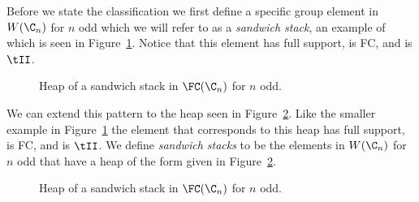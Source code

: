 Before we state the classification we first define a specific group element in $W(\C_n)$ for $n$ odd which we will refer to as a \emph{sandwich stack}, an example of which is seen in Figure~\ref{fig:singsandstack}. Notice that this element has full support, is FC, and is $\tII$.

\begin{figure}[h!] \centering
{}
\caption{Heap of a sandwich stack in $\FC(\C_n)$ for $n$ odd.}\label{fig:singsandstack}
\end{figure}

We can extend this pattern to the heap seen in Figure~\ref{fig:stacksandstack}. Like the smaller example in Figure~\ref{fig:singsandstack} the element that corresponds to this heap has full support, is FC, and is $\tII$. We define \emph{sandwich stacks} to be the elements in $W(\C_n)$ for $n$ odd that have a heap of the form given in Figure~\ref{fig:stacksandstack}.

\begin{figure}[h!] \centering
{}	
\caption{Heap of a sandwich stack in $\FC(\C_n)$ for $n$ odd.}\label{fig:stacksandstack}
\end{figure}


